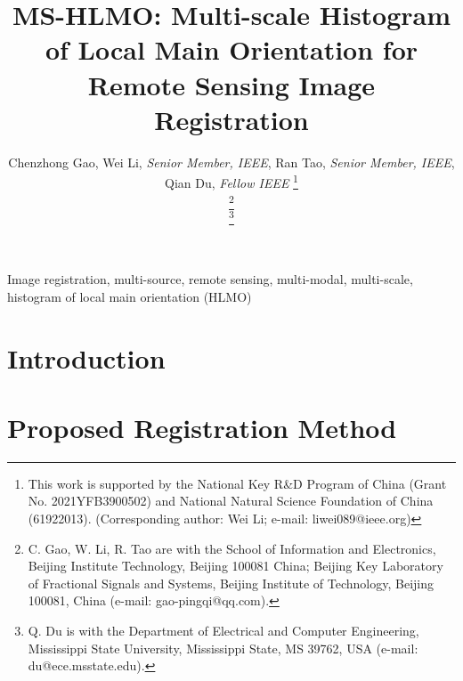 \documentclass[lettersize,journal]{IEEEtran}
\begin{document}
\title{MS-HLMO: Multi-scale Histogram of Local Main Orientation for Remote Sensing Image Registration}

\author{Chenzhong Gao, Wei Li, \emph{Senior Member, IEEE}, Ran Tao, \emph{Senior Member, IEEE}, Qian Du, \emph{Fellow IEEE}
\thanks{This work is supported by the National Key R\&D Program of China (Grant No. 2021YFB3900502) and National Natural Science Foundation of China (61922013). (Corresponding author: Wei Li; e-mail: liwei089@ieee.org)}

\thanks{C. Gao, W. Li, R. Tao are with the School of Information and Electronics, Beijing Institute Technology, Beijing 100081 China; Beijing Key Laboratory of Fractional Signals and Systems, Beijing Institute of Technology, Beijing 100081, China (e-mail: gao-pingqi@qq.com).}

\thanks{Q. Du is with the Department of Electrical and Computer Engineering, Mississippi State University, Mississippi State, MS 39762, USA (e-mail: du@ece.msstate.edu).}
}


\maketitle

\begin{abstract}

\end{abstract}

\begin{IEEEkeywords}
Image registration, multi-source, remote sensing, multi-modal, multi-scale, histogram of local main orientation (HLMO)
\end{IEEEkeywords}


\section{Introduction}
\label{sec:introduction}


%

\section{Proposed Registration Method}
\label{sec:method}

\end{document}
